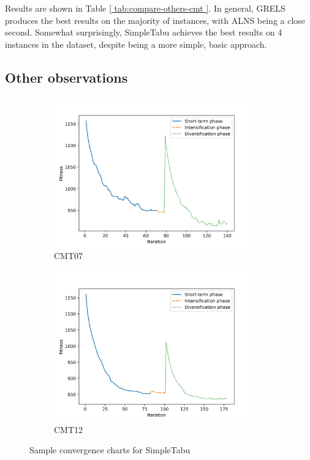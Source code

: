 \documentclass[12pt]{report}
\begin{document}


Results are shown in Table \ref{ tab:compare-others-cmt }. In general, GRELS produces the best results on the majority of instances, with ALNS being a close second. Somewhat surprisingly, SimpleTabu achieves the best results on 4 instances in the dataset, despite being a more simple, basic approach.

\subsection{Other observations}
\begin{figure}[ht]
    \centering
    \begin{subfigure}[b]{0.49\linewidth}
        \centering
        \includegraphics[width=0.95\textwidth]{images/converge_1.jpg}
        \caption{CMT07}
    \end{subfigure}
    \begin{subfigure}[b]{0.49\linewidth}
        \centering
        \includegraphics[width=0.95\textwidth]{images/converge_2.jpg}
        \caption{CMT12}
    \end{subfigure}
    \caption{Sample convergence charts for SimpleTabu}
	\label{fig:converge}
\end{figure}
\end{document}
